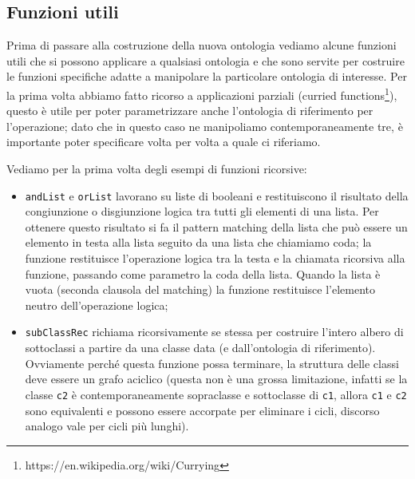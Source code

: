 \subsection{Funzioni utili}
Prima di passare alla costruzione della nuova ontologia vediamo alcune funzioni utili che si possono applicare a qualsiasi ontologia e che sono servite per costruire le funzioni specifiche adatte a manipolare la particolare ontologia di interesse.
Per la prima volta abbiamo fatto ricorso a applicazioni parziali (curried functions\footnote{https://en.wikipedia.org/wiki/Currying}), questo è utile per poter parametrizzare anche l'ontologia di riferimento per l'operazione; dato che in questo caso ne manipoliamo contemporaneamente tre, è importante poter specificare volta per volta a quale ci riferiamo.

Vediamo per la prima volta degli esempi di funzioni ricorsive:
\begin{itemize}
	\item \verb|andList| e \verb|orList| lavorano su liste di booleani e restituiscono il risultato della congiunzione o disgiunzione logica tra tutti gli elementi di una lista. Per ottenere questo risultato si fa il pattern matching della lista che può essere un elemento in testa alla lista seguito da una lista che chiamiamo coda; la funzione restituisce l'operazione logica tra la testa e la chiamata ricorsiva alla funzione, passando come parametro la coda della lista. Quando la lista è vuota (seconda clausola del matching) la funzione restituisce l'elemento neutro dell'operazione logica;
	\item \verb|subClassRec| richiama ricorsivamente se stessa per costruire l'intero albero di sottoclassi a partire da una classe data (e dall'ontologia di riferimento). Ovviamente perché questa funzione possa terminare, la struttura delle classi deve essere un grafo aciclico (questa non è una grossa limitazione, infatti se la classe \verb|c2| è contemporaneamente sopraclasse e sottoclasse di \verb|c1|, allora \verb|c1| e \verb|c2| sono equivalenti e possono essere accorpate per eliminare i cicli, discorso analogo vale per cicli più lunghi).
\end{itemize}

